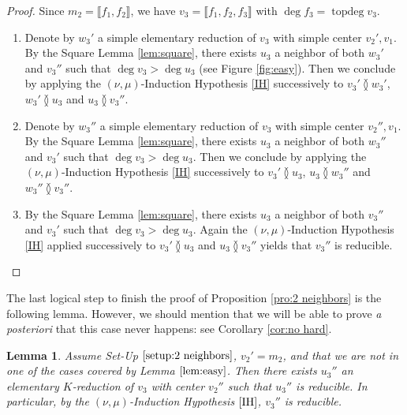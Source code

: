 \documentclass[reqno,oneside,11pt]{amsart}
\theoremstyle{plain}
\newtheorem{lemma}[theorem]{Lemma}
\theoremstyle{definition}
\DeclareMathOperator{\topdeg}{topdeg}
\renewcommand{\ne}{\between}
\newcommand{\llb}{\llbracket}
\newcommand{\rrb}{\rrbracket}
\begin{document}
\begin{proof}
Since $m_2 = \llb f_1, f_2 \rrb$, we have $v_3 = \llb f_1, f_2, f_3 \rrb$ with $\deg f_3 = \topdeg v_3$.
\begin{enumerate}[wide]
\item
Denote by $w_3'$ a simple elementary reduction of $v_3$ with simple center
$v_2', v_1$.
By the Square Lemma \ref{lem:square}, there exists $u_3$ a neighbor of both $w_3'$ and $v_3''$ such that $\deg v_3 > \deg u_3$ (see Figure \ref{fig:easy}).
Then we conclude by applying the $(\nu,\mu)$-Induction Hypothesis \ref{IH} successively to $v_3' \ne w_3'$, $w_3' \ne u_3$ and $u_3 \ne v_3''$.

\item
Denote by $w_3''$ a simple elementary reduction of $v_3$ with simple center
$v_2'', v_1$.
By the Square Lemma \ref{lem:square}, there exists $u_3$ a neighbor of both $w_3''$ and $v_3'$ such that $\deg v_3 > \deg u_3$.
Then we conclude by applying the $(\nu,\mu)$-Induction Hypothesis \ref{IH} successively to $v_3' \ne u_3$, $u_3 \ne w_3''$ and $w_3'' \ne v_3''$.

\item
By the Square Lemma \ref{lem:square}, there exists $u_3$ a neighbor of both $v_3''$ and $v_3'$ such that $\deg v_3 > \deg u_3$.
Again the $(\nu,\mu)$-Induction Hypothesis \ref{IH} applied successively to $v_3' \ne u_3$ and $u_3 \ne v_3''$ yields that $v_3''$ is reducible.
\qedhere
\end{enumerate}
\end{proof}

The last logical step to finish the proof of Proposition \ref{pro:2 neighbors} is the following lemma.
However, we should mention that we will be able to prove \textit{a posteriori} that this case never happens: see Corollary \ref{cor:no hard}.

\begin{lemma} \label{lem:hard}
Assume Set-Up $\ref{setup:2 neighbors}$, $v_2' = m_2$, and that we are not in one of the cases covered by Lemma $\ref{lem:easy}$.
Then there exists $u_3''$ an elementary $K$-reduction of $v_3$ with center $v_2''$ such that $u_3''$ is reducible.
In particular, by the $(\nu,\mu)$-Induction Hypothesis $\ref{IH}$, $v_3''$ is reducible.
\end{lemma}
\end{document}
